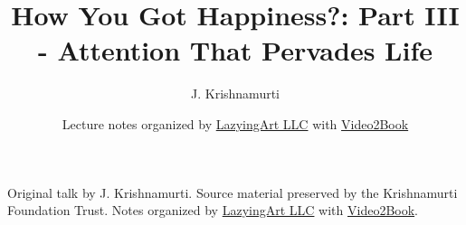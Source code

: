 \documentclass[11pt,oneside]{book}
\begin{document}
\frontmatter
\title{How You Got Happiness?: Part III - Attention That Pervades Life}
\author{J. Krishnamurti}
\date{Lecture notes organized by \href{https://lazying.art}{LazyingArt LLC} with \href{https://github.com/lachlanchen/Video2Book}{Video2Book}}
\maketitle
\begin{center}
\small Original talk by J. Krishnamurti. Source material preserved by the Krishnamurti Foundation Trust. Notes organized by \href{https://lazying.art}{LazyingArt LLC} with \href{https://github.com/lachlanchen/Video2Book}{Video2Book}.
\end{center}
\clearpage
\mainmatter

\end{document}
